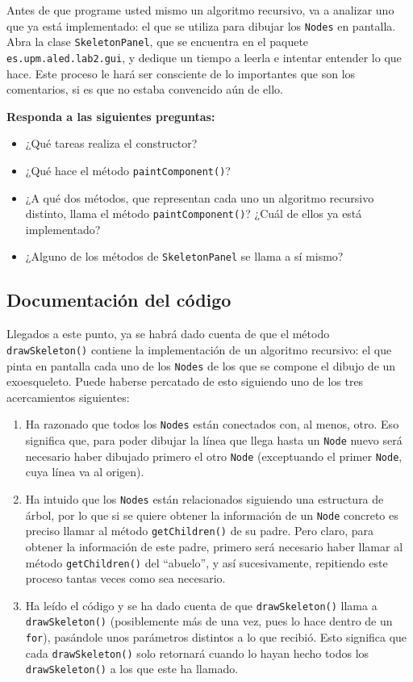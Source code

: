 \documentclass[10pt,a4paper,spanish]{article}
\newcommand{\code}[1]{\texttt{#1}}
\begin{document}
Antes de que programe usted mismo un algoritmo recursivo, va a analizar uno que ya está implementado: el que se utiliza para dibujar los \code{Nodes} en pantalla. Abra la clase \code{SkeletonPanel}, que se encuentra en el paquete \code{es.upm.aled.lab2.gui}, y dedique un tiempo a leerla e intentar entender lo que hace. Este proceso le hará ser consciente de lo importantes que son los comentarios, si es que no estaba convencido aún de ello.

\textbf{Responda a las siguientes preguntas:}

\begin{itemize}
    \item ¿Qué tareas realiza el constructor?
    \item ¿Qué hace el método \code{paintComponent()}?
    \item ¿A qué dos métodos, que representan cada uno un algoritmo recursivo distinto, llama el método \code{paintComponent()}? ¿Cuál de ellos ya está implementado?
    \item ¿Alguno de los métodos de \code{SkeletonPanel} se llama a sí mismo?
\end{itemize}

\subsection{Documentación del código}

Llegados a este punto, ya se habrá dado cuenta de que el método \code{drawSkeleton()} contiene la implementación de un algoritmo recursivo: el que pinta en pantalla cada uno de los \code{Nodes} de los que se compone el dibujo de un exoesqueleto. Puede haberse percatado de esto siguiendo uno de los tres acercamientos siguientes:

\begin{enumerate}
    \item Ha razonado que todos los \code{Nodes} están conectados con, al menos, otro. Eso significa que, para poder dibujar la línea que llega hasta un \code{Node} nuevo será necesario haber dibujado primero el otro \code{Node} (exceptuando el primer \code{Node}, cuya línea va al origen).
    \item Ha intuido que los \code{Nodes} están relacionados siguiendo una estructura de árbol, por lo que si se quiere obtener la información de un \code{Node} concreto es preciso llamar al método \code{getChildren()} de su padre. Pero claro, para obtener la información de este padre, primero será necesario haber llamar al método \code{getChildren()} del ``abuelo'', y así sucesivamente, repitiendo este proceso tantas veces como sea necesario.
    \item Ha leído el código y se ha dado cuenta de que \code{drawSkeleton()} llama a \code{drawSkeleton()} (posiblemente más de una vez, pues lo hace dentro de un \code{for}), pasándole unos parámetros distintos a lo que recibió. Esto significa que cada \code{drawSkeleton()} solo retornará cuando lo hayan hecho todos los \code{drawSkeleton()} a los que este ha llamado.
\end{enumerate}
\end{document}
